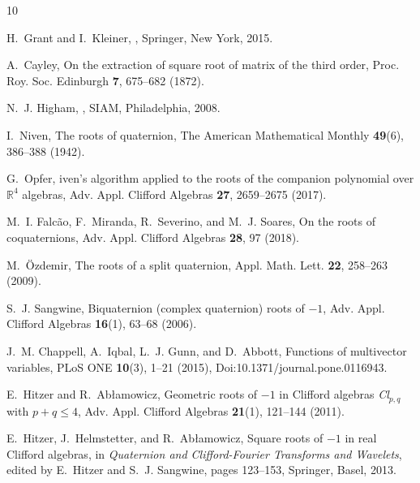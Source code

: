 \documentclass{birkjour}
\begin{document}
%
%
\begin{thebibliography}{10}

H.~Grant and I.~Kleiner,
,
\newblock Springer, New York, 2015.

A.~Cayley,
\newblock On the extraction of square root of matrix of the third order,
\newblock Proc. Roy. Soc. Edinburgh {\bf 7}, 675--682 (1872).

N.~J. Higham,
,
\newblock SIAM, Philadelphia, 2008.

I.~Niven,
\newblock The roots of quaternion,
\newblock The American Mathematical Monthly {\bf 49}(6), 386--388 (1942).

G.~Opfer,
iven's algorithm applied to the roots of the companion polynomial
  over $\mathbb{R}^4$ algebras,
\newblock Adv. Appl. Clifford Algebras {\bf 27}, 2659--2675 (2017).

M.~I. Falc{\~a}o, F.~Miranda, R.~Severino, and M.~J. Soares,
\newblock On the roots of coquaternions,
\newblock Adv. Appl. Clifford Algebras {\bf 28}, 97 (2018).

M.~{\"O}zdemir,
\newblock The roots of a split quaternion,
\newblock Appl. Math. Lett. {\bf 22}, 258--263 (2009).

S.~J. Sangwine,
\newblock Biquaternion (complex quaternion) roots of $-1$,
\newblock Adv. Appl. Clifford Algebras {\bf 16}(1), 63--68 (2006).

J.~M. Chappell, A.~Iqbal, L.~J. Gunn, and D.~Abbott,
\newblock Functions of multivector variables,
\newblock PLoS ONE {\bf 10}(3), 1--21 (2015),
\newblock Doi:10.1371/journal.pone.0116943.

E.~Hitzer and R.~Ab{\l}amowicz,
\newblock Geometric roots of $-1$ in {C}lifford algebras \textit{Cl}$_{p,q}$
  with $p+q\le 4$,
\newblock Adv. Appl. Clifford Algebras {\bf 21}(1), 121--144 (2011).

E.~Hitzer, J.~Helmstetter, and R.~Ab{\l}amowicz,
\newblock Square roots of $-1$ in real {C}lifford algebras,
\newblock in {\em Quaternion and Clifford-Fourier Transforms and Wavelets},
  edited by E.~Hitzer and S.~J. Sangwine, pages 123--153, Springer, Basel,
  2013.


\end{thebibliography}
\end{document}
